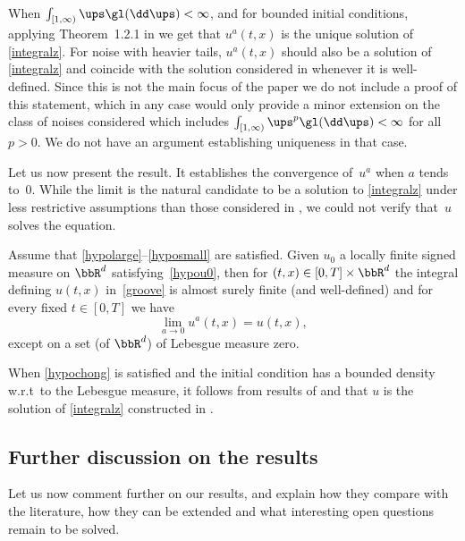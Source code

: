 \begin{rem}
When $\int_{[1,\infty)} \ups\gl(\dd \ups)<\infty$, and for bounded initial conditions, applying Theorem~1.2.1 in \cite{Loubert98} we get that $u^a(t,x)$ is the unique solution of \eqref{integralz}.
For noise with heavier tails, $u^a(t,x)$ should also be a solution of \eqref{integralz} and coincide with the solution considered in \cite{Chong17} whenever it is well-defined. Since this is not the main focus of the paper we do not include a proof of this statement, which in any case would only provide a minor extension on the class of noises considered \cite{Chong17} which includes $\int_{[1,\infty)} \ups^p\gl(\dd \ups)<\infty$ for all $p>0$. We do not have an argument establishing uniqueness in that case.
\end{rem}

Let us now present the result. It establishes the convergence of~$u^a$ when $a$ tends to~$0$. While the limit is the natural candidate to be a solution to \eqref{integralz} under less restrictive assumptions than those considered in \cite{Chong17}, we could not verify that~$u$ solves the equation.

\begin{proposition}
\label{prop:SHE}
Assume that \eqref{hypolarge}--\eqref{hyposmall} are satisfied.
Given $u_0$ a locally finite signed measure on $\bbR^d$
satisfying~\eqref{hypou0},
then for $(t,x)\in [0,T]\times \bbR^d$ the integral defining
$u(t,x)$ in~\eqref{groove} is almost surely finite (and well-defined)
and for every fixed $t\in[0,T]$ we have\vspace*{-3pt}\enlargethispage{.5\baselineskip}%
\[
\lim_{a\to 0} u^{a}(t,x)=u(t,x),
\]
except on a set (of $\bbR^d$) of Lebesgue measure zero.
\end{proposition}

\begin{rem}
When \eqref{hypochong} is satisfied and the initial condition has a bounded density w.r.t\ to the Lebesgue measure, it follows from results of \cite{Chong17} and \cite{Loubert98} that $u$ is the solution of \eqref{integralz} constructed in \cite[Th.\,3.1]{Chong17}.
\end{rem}

\subsection{Further discussion on the results}
\label{sec:comments}

Let us now comment further on our results,
and explain how they compare with the literature,
how they can be extended and what interesting open questions remain to be solved.

